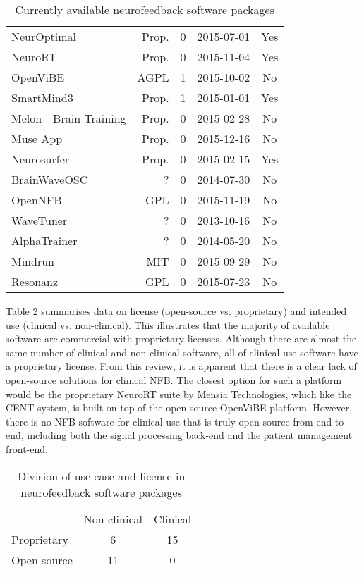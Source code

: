 \begin{table}[ht]
\begin{tabular}{lrrrc}
NeurOptimal & Prop. & 0 & 2015-07-01 & Yes \\
NeuroRT & Prop. & 0 & 2015-11-04 & Yes \\
OpenViBE & AGPL & 1 & 2015-10-02 & No \\
SmartMind3 & Prop. & 1 & 2015-01-01 & Yes \\
Melon - Brain Training & Prop. & 0 & 2015-02-28 & No \\
Muse App & Prop. & 0 & 2015-12-16 & No \\
Neurosurfer & Prop. & 0 & 2015-02-15 & Yes \\
BrainWaveOSC & ? & 0 & 2014-07-30 & No \\
OpenNFB & GPL & 0 & 2015-11-19 & No \\
WaveTuner & ? & 0 & 2013-10-16 & No \\
AlphaTrainer & ? & 0 & 2014-05-20 & No \\
Mindrun & MIT & 0 & 2015-09-29 & No \\
Resonanz & GPL & 0 & 2015-07-23 & No \\
\end{tabular}
    \caption{Currently available neurofeedback software packages}\label{nfbsoftware}
\end{table}


Table \ref{nfbsummary} summarises data on license (open-source vs. proprietary) and intended use (clinical vs. non-clinical). This illustrates that the majority of available software are commercial with  proprietary licenses. Although there are almost the same number of clinical and non-clinical software, all of clinical use software have a proprietary license. From this review, it is apparent that there is a clear lack of open-source solutions for clinical NFB. The closest option for such a platform would be the proprietary NeuroRT suite by Mensia Technologies, which like the CENT system, is built on top of the open-source OpenViBE platform. However, there is no NFB software for clinical use that is truly open-source from end-to-end, including both the signal processing back-end and the patient management front-end.


\begin{table}[h]
\centering
\begin{tabular}{lcc}
& Non-clinical  & Clinical \\       
Proprietary & 6 & 15 \\
Open-source  & 11 & 0 \\
\end{tabular}
    \caption{Division of use case and license in neurofeedback software packages}\label{nfbsummary}
\end{table}



